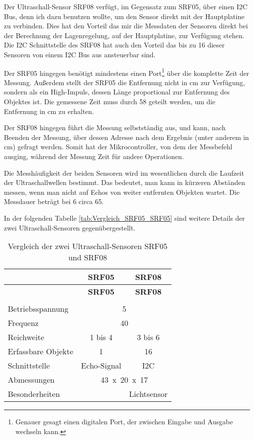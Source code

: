 Der Ultraschall-Sensor SRF08 verfügt, im Gegensatz zum SRF05,
über einen \ac{I2C} Bus, denn ich dazu benutzen wollte,
um den Sensor direkt mit der Hauptplatine zu verbinden.
Dies hat den Vorteil das mir die Messdaten der Sensoren
direkt bei der Berechnung der Lagenregelung,
auf der Hauptplatine, zur Verfügung stehen.
Die \ac{I2C} Schnittstelle des SRF08 hat auch
den Vorteil das bis zu 16 dieser Sensoren von einem
\ac{I2C} Bus aus ansteuerbar sind.

Der SRF05 hingegen benötigt mindestens einen Port\footnote{Genauer gesagt einen digitalen Port, der
zwischen Eingabe und Ausgabe wechseln kann.}
über die komplette Zeit der Messung.
Außerdem stellt der SRF05 die Entfernung nicht in \si{\centi\metre} zur Verfügung,
sondern als ein High-Impuls, dessen Länge proportional zur Entfernung des Objektes ist.
Die gemessene Zeit muss durch 58 geteilt werden,
um die Entfernung in \si{\centi\metre} zu erhalten.

Der SRF08 hingegen führt die Messung selbstständig aus,
und kann, nach Beenden der Messung, über dessen Adresse
nach dem Ergebnis (unter anderem in \si{\centi\metre})
gefragt werden.
Somit hat der Mikrocontroller, von dem der Messbefehl ausging,
während der Messung Zeit für andere Operationen.

Die Messhäufigkeit der beiden Sensoren wird im wesentlichen
durch die Laufzeit der Ultraschallwellen bestimmt.
Das bedeutet, man kann in kürzeren Abständen messen,
wenn man nicht auf Echos von weiter entfernten Objekten wartet.
Die Messdauer beträgt bei \unit{6}{\metre} circa \unit{65}{\milli\second}.

In der folgenden Tabelle \vref{tab:Vergleich_SRF05_SRF05} sind weitere
Details der zwei Ultraschall-Sensoren gegenübergestellt.

\renewcommand{\longtableheader}{& \textbf{SRF05} & \textbf{SRF08} \\}
\begin{longtable}{lcc}
	\label{tab:Vergleich_SRF05_SRF05}
	\longtableheader
	\endfirsthead
	\longtableheader
	\endhead
	\caption{Vergleich der zwei Ultraschall-Sensoren SRF05 und SRF08}
	\endlastfoot
	\multicolumn{3}{r}{\longtableendfoot} \\
	\endfoot

	Betriebsspannung	& \multicolumn{2}{c}{\unit{5}{\volt}} \\
	Frequenz			& \multicolumn{2}{c}{\unit{40}{\kilo\hertz}} \\
	Reichweite			& \unit{1}{\centi\metre} bis \unit{4}{\metre}
		& \unit{3}{\centi\metre} bis \unit{6}{\metre} \\
	Erfassbare Objekte	& 1					& 16 \\
	Schnittstelle		& Echo-Signal		& \acs{I2C} \\
	Abmessungen			& \multicolumn{2}{c}{\unit{43 x 20 x 17}
		{\milli\metre}} \\
	Besonderheiten		& \textdiscount		& Lichtsensor \\
\end{longtable}

